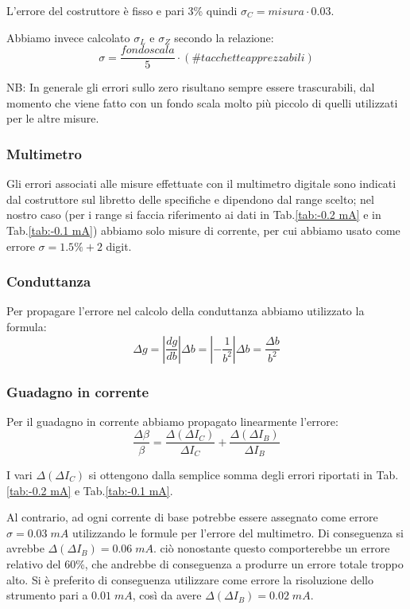\documentclass[a4paper, 11pt]{article}
\begin{document}
L'errore del costruttore è fisso e pari 3\% quindi $\sigma_C = misura \cdot 0.03$.

Abbiamo invece calcolato $\sigma_L$ e $\sigma_Z$ secondo la relazione: 
\begin{equation*}
    \sigma = \frac{fondo scala}{5} \cdot ( \# tacchette apprezzabili)
\end{equation*}

NB: In generale gli errori sullo zero risultano sempre essere trascurabili, dal momento che viene fatto con un fondo scala molto più piccolo di quelli utilizzati per le altre misure.

\subsubsection{Multimetro}
Gli errori associati alle misure effettuate con il multimetro digitale sono indicati dal costruttore sul libretto delle specifiche e dipendono dal range scelto; nel nostro caso (per i range si faccia riferimento ai dati in Tab.\ref{tab:-0.2 mA} e in Tab.\ref{tab:-0.1 mA}) abbiamo solo misure di corrente, per cui abbiamo usato come errore $\sigma = 1.5\% + 2$ digit.

\subsubsection{Conduttanza} \label{sec:errori-conduttanza}
Per propagare l'errore nel calcolo della conduttanza abbiamo utilizzato la formula:
\begin{equation*}
    \Delta g = \left|\frac{dg}{db}\right| \Delta b = \left |-\frac{1}{b^2}\right| \Delta b = \frac{\Delta b}{b^2}
\end{equation*}

\subsubsection{Guadagno in corrente} \label{sec:errori-beta}
Per il guadagno in corrente abbiamo propagato linearmente l'errore:
\begin{equation*}
    \frac{\Delta \beta}{\beta} = \frac{\Delta(\Delta I_C)}{\Delta I_C} +\frac{\Delta(\Delta I_B)}{\Delta I_B}
\end{equation*}

I vari $\Delta(\Delta I_C)$ si ottengono dalla semplice somma degli errori riportati in Tab.\ref{tab:-0.2 mA} e Tab.\ref{tab:-0.1 mA}.

Al contrario, ad ogni corrente di base potrebbe essere assegnato come errore $\sigma = 0.03 \;mA$ utilizzando le formule per l'errore del multimetro. Di conseguenza si avrebbe $\Delta(\Delta I_B) = 0.06 \; mA$. ciò nonostante questo comporterebbe un errore relativo del 60\%, che andrebbe di conseguenza a produrre un errore totale troppo alto. Si è preferito di conseguenza utilizzare come errore la risoluzione dello strumento pari a $0.01 \;mA$, così da avere $\Delta(\Delta I_B) = 0.02 \; mA$.
\end{document}
